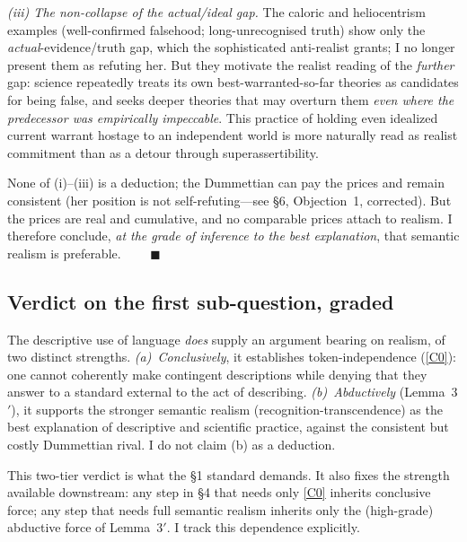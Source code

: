 \documentclass[12pt]{article}
\begin{document}
\noindent\emph{(iii) The non-collapse of the actual/ideal gap.} The
caloric and heliocentrism examples (well-confirmed falsehood; long-unrecognised
truth) show only the \emph{actual}-evidence/truth gap, which the
sophisticated anti-realist grants; I no longer present them as refuting
her. But they motivate the realist reading of the \emph{further}
gap: science repeatedly treats its own best-warranted-so-far theories as
candidates for being false, and seeks deeper theories that may overturn
them \emph{even where the predecessor was empirically impeccable}. This
practice of holding even idealized current warrant hostage to an
independent world is more naturally read as realist commitment than as a
detour through superassertibility.

\noindent None of (i)--(iii) is a deduction; the Dummettian can pay the
prices and remain consistent (her position is not self-refuting---see \S6,
Objection~1, corrected). But the prices are real and cumulative, and no
comparable prices attach to realism. I therefore conclude, \emph{at the
grade of inference to the best explanation}, that semantic realism is
preferable. $\qquad\blacksquare$

\subsection{Verdict on the first sub-question, graded}

\begin{description}[leftmargin=1.6em,style=nextline]
\item[Verdict on realism.] The descriptive use of language \emph{does}
supply an argument bearing on realism, of two distinct strengths.
\emph{(a)~Conclusively}, it establishes token-independence (\ref{C0}): one
cannot coherently make contingent descriptions while denying that they
answer to a standard external to the act of describing. \emph{(b)~Abductively}
(Lemma~3$'$), it supports the stronger semantic realism
(recognition-transcendence) as the best explanation of descriptive and
scientific practice, against the consistent but costly Dummettian rival.
I do not claim (b) as a deduction.
\end{description}

This two-tier verdict is what the \S1 standard demands. It also fixes the
strength available downstream: any step in \S4 that needs only \ref{C0}
inherits conclusive force; any step that needs full semantic realism
inherits only the (high-grade) abductive force of Lemma~3$'$. I track
this dependence explicitly.
\end{document}
